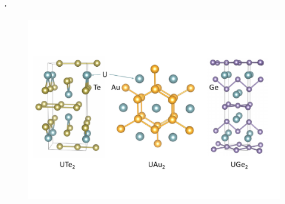 

\paragraph{.} 




\begin{figure}[t]
\centerline{\includegraphics[width=\columnwidth]{Figures/Structures.pdf}}


\end{figure}
